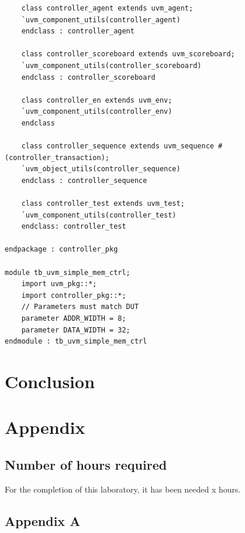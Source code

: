 \documentclass{article}
\begin{document}
\begin{verbatim}
    class controller_agent extends uvm_agent;
    `uvm_component_utils(controller_agent)
    endclass : controller_agent

    class controller_scoreboard extends uvm_scoreboard;
    `uvm_component_utils(controller_scoreboard)
    endclass : controller_scoreboard

    class controller_en extends uvm_env;
    `uvm_component_utils(controller_env)
    endclass

    class controller_sequence extends uvm_sequence #(controller_transaction);
    `uvm_object_utils(controller_sequence)
    endclass : controller_sequence

    class controller_test extends uvm_test;
    `uvm_component_utils(controller_test)
    endclass: controller_test

endpackage : controller_pkg

module tb_uvm_simple_mem_ctrl;
    import uvm_pkg::*;
    import controller_pkg::*;
    // Parameters must match DUT
    parameter ADDR_WIDTH = 8;
    parameter DATA_WIDTH = 32;
endmodule : tb_uvm_simple_mem_ctrl
\end{verbatim}

\section{Conclusion}



\newpage
\section{Appendix}
\subsection{Number of hours required}
For the completion of this laboratory, it has been needed x hours. 
\subsection{Appendix A}
% 
\end{document}
